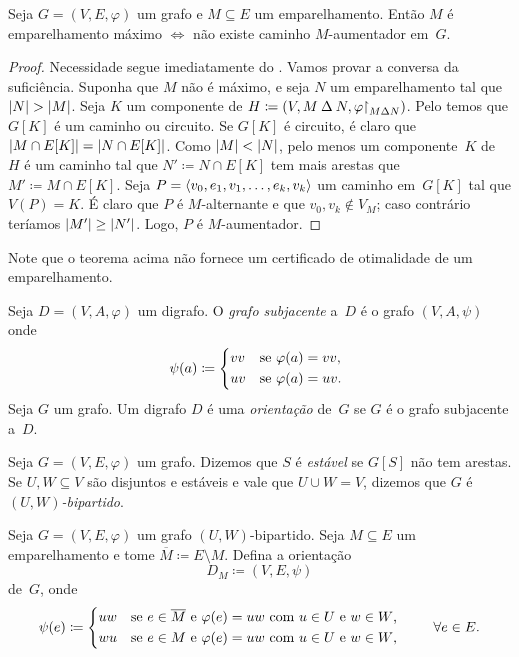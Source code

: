 \documentclass[10pt,reqno]{amsart}
\begin{document}
\begin{theorem}
  Seja \(G = (V,E,\varphi)\) um grafo e \(M \subseteq E\) um
  emparelhamento.  Então \(M\) é emparelhamento máximo \(\iff\) não
  existe caminho \(M\)-aumentador em~\(G\).
\end{theorem}
\begin{proof}
  Necessidade segue imediatamente do .  Vamos provar a
  conversa da suficiência.  Suponha que \(M\) não é máximo, e seja
  \(N\) um emparelhamento tal que \(\lvert N\rvert > \lvert M\rvert\).  Seja \(K\)
  um componente de
  \(H \coloneqq (V, M \mathbin{\Delta} N, \varphi\mathord{\restriction}_{M
    \mathbin{\Delta} N})\).  Pelo  temos que \(G[K]\) é um
  caminho ou circuito.  Se \(G[K]\) é circuito, é claro que
  \(\lvert M \cap E[K]\rvert = \lvert N \cap E[K]\rvert\).  Como
  \(\lvert M\rvert < \lvert N\rvert\), pelo menos um componente~\(K\) de~\(H\) é
  um caminho tal que \(N' \coloneqq N \cap E[K]\) tem mais arestas que
  \(M' \coloneqq M \cap E[K]\).  Seja
  \(P = \langle v_0,e_1,v_1,\dotsc,e_k,v_k\rangle\) um caminho em~\(G[K]\) tal
  que \(V(P) = K\).  É claro que \(P\) é \(M\)-alternante e que
  \(v_0, v_k \not\in V_M\); caso contrário teríamos
  \(\lvert M'\rvert \geq \lvert N'\rvert\).  Logo, \(P\) é \(M\)-aumentador.
\end{proof}

Note que o teorema acima não fornece um certificado de otimalidade de
um emparelhamento.

Seja \(D = (V,A,\varphi)\) um digrafo.  O \emph{grafo subjacente}
a~\(D\) é o grafo \((V,A,\psi)\) onde
\begin{equation*}
  \psi(a)
  \coloneqq
  \begin{cases*}
    vv
    &
    se \(\varphi(a) = vv\),
    \\
    uv
    &
    se \(\varphi(a) = uv\).
  \end{cases*}
\end{equation*}
Seja \(G\) um grafo.  Um digrafo \(D\) é uma \emph{orientação}
de~\(G\) se \(G\) é o grafo subjacente a~\(D\).

Seja \(G = (V,E,\varphi)\) um grafo.  Dizemos que \(S\) é
\emph{estável} se \(G[S]\) não tem arestas.  Se \(U,W \subseteq V\)
são disjuntos e estáveis e vale que \(U \cup W = V\), dizemos que
\(G\) é \emph{\((U,W)\)-bipartido}.

Seja \(G = (V,E,\varphi)\) um grafo \((U,W)\)-bipartido.  Seja
\(M \subseteq E\) um emparelhamento e tome
\(\overline{M} \coloneqq E \setminus M\).  Defina a orientação
\begin{equation}
  \label{eq:14}
  D_M \coloneqq (V,E,\psi)
\end{equation}
de~\(G\), onde
\begin{equation*}
  \psi(e)
  \coloneqq
  \begin{cases*}
    uw
    &
    se \(e \in \overline{M}\) e \(\varphi(e) = uw\) com \(u \in U\) e \(w \in W\),
    \\
    wu
    &
    se \(e \in M\) e \(\varphi(e) = uw\)  com \(u \in U\) e \(w \in W\),
  \end{cases*}
  \qquad
  \forall e \in E.
\end{equation*}
\end{document}
